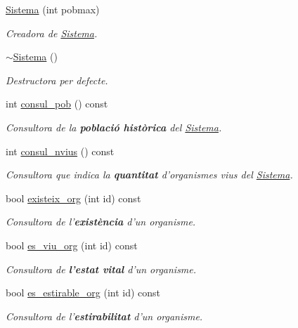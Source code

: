 \begin{DoxyCompactItemize}
\item 
\hyperlink{class_sistema_af9b1456fcf4e33c12d183692109c27fc}{Sistema} (int pobmax)
\begin{DoxyCompactList}\small\item\em Creadora de \hyperlink{class_sistema}{Sistema}. \end{DoxyCompactList}\item 
\hyperlink{class_sistema_aafc86e0f2c3d734fb4c0985f70c27a1a}{$\sim$\-Sistema} ()
\begin{DoxyCompactList}\small\item\em Destructora per defecte. \end{DoxyCompactList}\item 
int \hyperlink{class_sistema_a084895a86d0230cbb4af0d0041422fe3}{consul\-\_\-pob} () const 
\begin{DoxyCompactList}\small\item\em Consultora de la {\bfseries població històrica} del \hyperlink{class_sistema}{Sistema}. \end{DoxyCompactList}\item 
int \hyperlink{class_sistema_a112609f3baf6a0267ce61aab10020418}{consul\-\_\-nvius} () const 
\begin{DoxyCompactList}\small\item\em Consultora que indica la {\bfseries quantitat} d'organismes vius del \hyperlink{class_sistema}{Sistema}. \end{DoxyCompactList}\item 
bool \hyperlink{class_sistema_aa56f1fe7fee226ff6624363695ace488}{existeix\-\_\-org} (int id) const 
\begin{DoxyCompactList}\small\item\em Consultora de l'{\bfseries existència} d'un organisme. \end{DoxyCompactList}\item 
bool \hyperlink{class_sistema_a3eba48be6e01d213f87d9c12c22530fe}{es\-\_\-viu\-\_\-org} (int id) const 
\begin{DoxyCompactList}\small\item\em Consultora de {\bfseries l'estat vital} d'un organisme. \end{DoxyCompactList}\item 
bool \hyperlink{class_sistema_a3ab5d199d6f7af87c3b00f51702da9dc}{es\-\_\-estirable\-\_\-org} (int id) const 
\begin{DoxyCompactList}\small\item\em Consultora de l'{\bfseries estirabilitat} d'un organisme. \end{DoxyCompactList}\item 

\end{DoxyCompactItemize}
